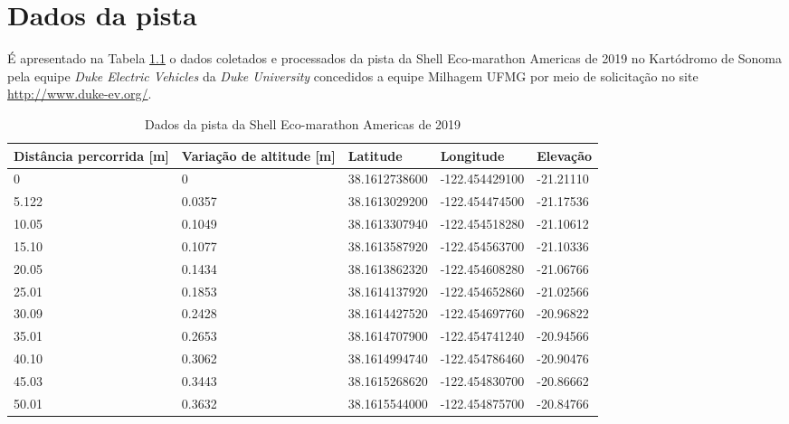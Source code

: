 \chapter{Dados da pista}

É apresentado na Tabela \ref{tab:Pista} o dados coletados e processados da pista da Shell Eco-marathon Americas de 2019
 no Kartódromo de Sonoma pela equipe \textit{Duke Electric Vehicles} da 
\textit{Duke University} concedidos a equipe Milhagem UFMG por meio de solicitação no site \url{http://www.duke-ev.org/}.
\begin{scriptsize}
    \begin{longtable}{p{2.5cm}p{2.5cm}p{3cm}p{3cm}p{2.5cm}}
        \caption{Dados da pista da Shell Eco-marathon Americas de 2019}\label{tab:Pista}\\
        \toprule
        \textbf{Distância percorrida [m]} & \textbf{Variação de altitude [m]} & \textbf{Latitude} & \textbf{Longitude} &\textbf{Elevação}\\
        \hline
            0	  &       0	    &               38.1612738600  &   -122.454429100   &	-21.21110 \\
            5.122  &	     0.0357 &               38.1613029200  &   -122.454474500   &	-21.17536 \\
            10.05  &	     0.1049 &               38.1613307940  &   -122.454518280   &	-21.10612 \\
            15.10  &	     0.1077 &               38.1613587920  &   -122.454563700   &	-21.10336 \\
            20.05  &	     0.1434 &               38.1613862320  &   -122.454608280   &	-21.06766 \\
            25.01  &	     0.1853 &               38.1614137920  &   -122.454652860   &	-21.02566 \\
            30.09  &	     0.2428 &               38.1614427520  &   -122.454697760   &	-20.96822 \\
            35.01  &	     0.2653 &               38.1614707900  &   -122.454741240   &	-20.94566 \\
            40.10  &	     0.3062 &               38.1614994740  &   -122.454786460   &	-20.90476 \\
            45.03  &	     0.3443 &               38.1615268620  &   -122.454830700   &	-20.86662 \\
            50.01  &	     0.3632 &               38.1615544000  &   -122.454875700   &	-20.84766 \\

\end{longtable}
\end{scriptsize}
